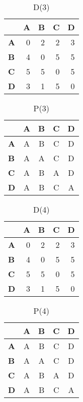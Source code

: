 \documentclass{article}
\begin{document}
\begin{table}[H]\centering
\caption{D(3)}
\begin{tabular}{l r r r r}
\toprule
 & \textbf{A} & \textbf{B} & \textbf{C} & \textbf{D}\\\midrule
\textbf{A} & 0 & 2 & 2 & 3 \\
\textbf{B} & 4 & 0 & 5 & 5 \\
\textbf{C} & 5 & 5 & 0 & 5 \\
\textbf{D} & 3 & 1 & 5 & 0 \\
\bottomrule
\end{tabular}
\end{table}

\begin{table}[H]\centering
\caption{P(3)}
\begin{tabular}{l c c c c}
\toprule
 & \textbf{A} & \textbf{B} & \textbf{C} & \textbf{D}\\\midrule
\textbf{A} & A & B & C & D \\
\textbf{B} & A & A & C & D \\
\textbf{C} & A & B & A & D \\
\textbf{D} & A & B & C & A \\
\bottomrule
\end{tabular}
\end{table}

\begin{table}[H]\centering
\caption{D(4)}
\begin{tabular}{l r r r r}
\toprule
 & \textbf{A} & \textbf{B} & \textbf{C} & \textbf{D}\\\midrule
\textbf{A} & 0 & 2 & 2 & 3 \\
\textbf{B} & 4 & 0 & 5 & 5 \\
\textbf{C} & 5 & 5 & 0 & 5 \\
\textbf{D} & 3 & 1 & 5 & 0 \\
\bottomrule
\end{tabular}
\end{table}

\begin{table}[H]\centering
\caption{P(4)}
\begin{tabular}{l c c c c}
\toprule
 & \textbf{A} & \textbf{B} & \textbf{C} & \textbf{D}\\\midrule
\textbf{A} & A & B & C & D \\
\textbf{B} & A & A & C & D \\
\textbf{C} & A & B & A & D \\
\textbf{D} & A & B & C & A \\
\bottomrule
\end{tabular}
\end{table}
\end{document}
